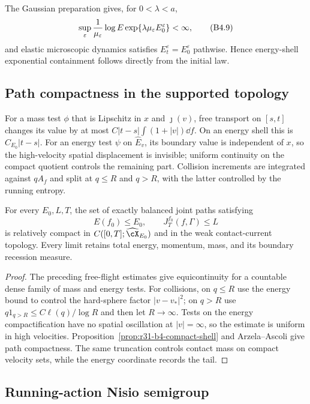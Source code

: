 The Gaussian preparation gives, for $0<\lambda<a$,
\[
 \sup_\varepsilon{1\over\mu_\varepsilon}
 \log E\exp\{\lambda\mu_\varepsilon E_0^\varepsilon\}<\infty,           \tag{B4.9}
\]
and elastic microscopic dynamics satisfies
$E_t^\varepsilon=E_0^\varepsilon$ pathwise.  Hence energy-shell exponential
containment follows directly from the initial law.

\subsection{Path compactness in the supported topology}

For a mass test $\phi$ that is Lipschitz in $x$ and $\jmath(v)$,
free transport on $[s,t]$ changes its value by at most
$C|t-s|\int(1+|v|)\dd f$.  On an energy shell this is
$C_{E_0}|t-s|$.  For an energy test $\psi$ on $\widehat E_v$, its boundary
value is independent of $x$, so the high-velocity spatial displacement is
invisible; uniform continuity on the compact quotient controls the remaining
part.  Collision increments are integrated against $qA_f$ and split at
$q\le R$ and $q>R$, with the latter controlled by the running entropy.

\begin{theorem}
\label{thm:r31-b4-path-compact}
For every $E_0,L,T$, the set of exactly balanced joint paths satisfying
\[
 E(f_0)\le E_0,\qquad J_T^{f_0}(f,\Gamma)\le L             \tag{B4.10}
\]
is relatively compact in
$C([0,T];\widehat\cX_{E_0})$ and in the weak contact-current topology.
Every limit retains total energy, momentum, mass, and its boundary recession
measure.
\end{theorem}

\begin{proof}
The preceding free-flight estimates give equicontinuity for a countable dense
family of mass and energy tests.  For collisions, on $q\le R$ use the energy
bound to control the hard-sphere factor $|v-v_*|^2$; on $q>R$ use
$q1_{q>R}\le C\ell(q)/\log R$ and then let $R\to\infty$.  Tests on the energy
compactification have no spatial oscillation at $|v|=\infty$, so the estimate
is uniform in high velocities.  Proposition~\ref{prop:r31-b4-compact-shell}
and Arzela--Ascoli give path compactness.  The same truncation controls contact
mass on compact velocity sets, while the energy coordinate records the tail.
\end{proof}

\subsection{Running-action Nisio semigroup}

